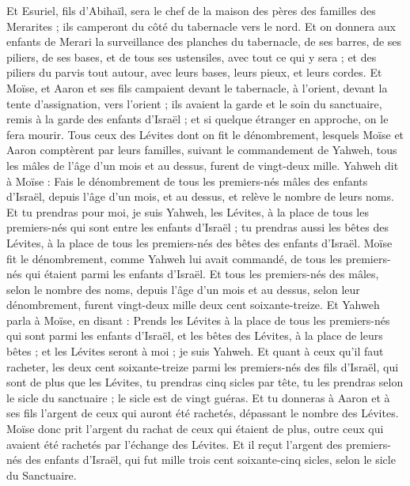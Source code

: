 \begin{multicols}{2}
Et Esuriel, fils d'Abihaïl, sera le chef de la maison des pères des familles des Merarites ; ils camperont du côté du tabernacle vers le nord.
Et on donnera aux enfants de Merari la surveillance des planches du tabernacle, de ses barres, de ses piliers, de ses bases, et de tous ses ustensiles, avec tout ce qui y sera ;
et des piliers du parvis tout autour, avec leurs bases, leurs pieux, et leurs cordes.
Et Moïse, et Aaron et ses fils campaient devant le tabernacle, à l'orient, devant la tente d'assignation, vers l'orient ; ils avaient la garde et le soin du sanctuaire, remis à la garde des enfants d'Israël ; et si quelque étranger en approche, on le fera mourir.
Tous ceux des Lévites dont on fit le dénombrement, lesquels Moïse et Aaron comptèrent par leurs familles, suivant le commandement de Yahweh, tous les mâles de l'âge d'un mois et au dessus, furent de vingt-deux mille.
Yahweh dit à Moïse : Fais le dénombrement de tous les premiers-nés mâles des enfants d'Israël, depuis l'âge d'un mois, et au dessus, et relève le nombre de leurs noms.
Et tu prendras pour moi, je suis Yahweh, les Lévites, à la place de tous les premiers-nés qui sont entre les enfants d'Israël ; tu prendras aussi les bêtes des Lévites, à la place de tous les premiers-nés des bêtes des enfants d'Israël.
Moïse fit le dénombrement, comme Yahweh lui avait commandé, de tous les premiers-nés qui étaient parmi les enfants d'Israël.
Et tous les premiers-nés des mâles, selon le nombre des noms, depuis l'âge d'un mois et au dessus, selon leur dénombrement, furent vingt-deux mille deux cent soixante-treize.
Et Yahweh parla à Moïse, en disant :
Prends les Lévites à la place de tous les premiers-nés qui sont parmi les enfants d'Israël, et les bêtes des Lévites, à la place de leurs bêtes ; et les Lévites seront à moi ; je suis Yahweh.
Et quant à ceux qu'il faut racheter, les deux cent soixante-treize parmi les premiers-nés des fils d'Israël, qui sont de plus que les Lévites,
tu prendras cinq sicles par tête, tu les prendras selon le sicle du sanctuaire ; le sicle est de vingt guéras.
Et tu donneras à Aaron et à ses fils l'argent de ceux qui auront été rachetés, dépassant le nombre des Lévites.
Moïse donc prit l'argent du rachat de ceux qui étaient de plus, outre ceux qui avaient été rachetés par l'échange des Lévites.
Et il reçut l'argent des premiers-nés des enfants d'Israël, qui fut mille trois cent soixante-cinq sicles, selon le sicle du Sanctuaire.

\end{multicols}
